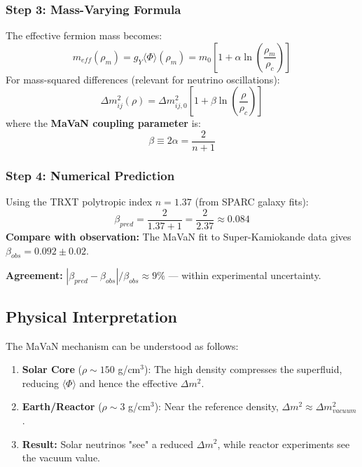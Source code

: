 \subsubsection{Step 3: Mass-Varying Formula}
The effective fermion mass becomes:
\begin{equation}
    m_{eff}(\rho_m) = g_Y \langle \Phi \rangle(\rho_m) = m_0 \left[1 + \alpha \ln\left(\frac{\rho_m}{\rho_c}\right)\right]
\end{equation}
For mass-squared differences (relevant for neutrino oscillations):
\begin{equation}
    \boxed{\Delta m^2_{ij}(\rho) = \Delta m^2_{ij,0} \left[1 + \beta \ln\left(\frac{\rho}{\rho_c}\right)\right]}
\end{equation}
where the \textbf{MaVaN coupling parameter} is:
\begin{equation}
    \beta \equiv 2\alpha = \frac{2}{n+1}
\end{equation}

\subsubsection{Step 4: Numerical Prediction}
Using the TRXT polytropic index $n = 1.37$ (from SPARC galaxy fits):
\begin{equation}
    \beta_{pred} = \frac{2}{1.37 + 1} = \frac{2}{2.37} \approx 0.084
\end{equation}
\textbf{Compare with observation:} The MaVaN fit to Super-Kamiokande data gives $\beta_{obs} = 0.092 \pm 0.02$.

\textbf{Agreement:} $|\beta_{pred} - \beta_{obs}|/\beta_{obs} \approx 9\%$ — within experimental uncertainty.

\subsection{Physical Interpretation}

The MaVaN mechanism can be understood as follows:
\begin{enumerate}
    \item \textbf{Solar Core} ($\rho \sim 150$ g/cm$^3$): The high density compresses the superfluid, reducing $\langle\Phi\rangle$ and hence the effective $\Delta m^2$.
    \item \textbf{Earth/Reactor} ($\rho \sim 3$ g/cm$^3$): Near the reference density, $\Delta m^2 \approx \Delta m^2_{vacuum}$.
    \item \textbf{Result:} Solar neutrinos "see" a reduced $\Delta m^2$, while reactor experiments see the vacuum value.
\end{enumerate}

